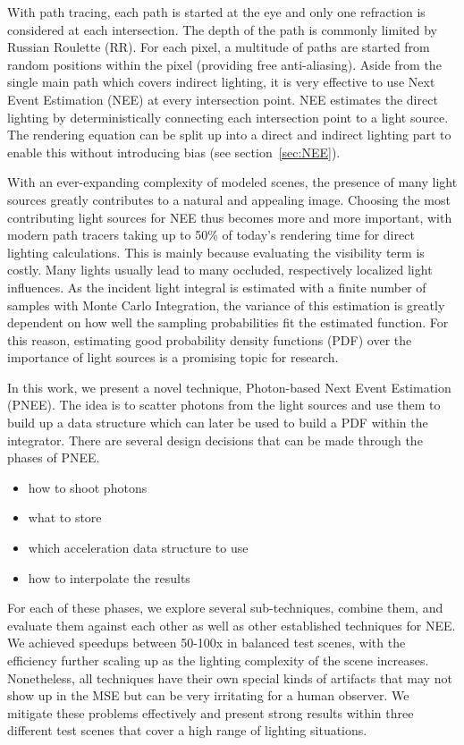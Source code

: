 With path tracing, each path is started at the eye and only one refraction is considered at each intersection. The depth of the path is commonly limited by Russian Roulette (RR). For each pixel, a multitude of paths are started from random positions within the pixel (providing free anti-aliasing). Aside from the single main path which covers indirect lighting, it is very effective to use Next Event Estimation (NEE) at every intersection point. NEE estimates the direct lighting by deterministically connecting each intersection point to a light source. The rendering equation can be split up into a direct and indirect lighting part to enable this without introducing bias (see section~\ref{sec:NEE}).

With an ever-expanding complexity of modeled scenes, the presence of many light sources greatly contributes to a natural and appealing image. Choosing the most contributing light sources for NEE thus becomes more and more important, with modern path tracers taking up to 50\% of today's rendering time for direct lighting calculations. This is mainly because evaluating the visibility term is costly. Many lights usually lead to many occluded, respectively localized light influences. As the incident light integral is estimated with a finite number of samples with Monte Carlo Integration, the variance of this estimation is greatly dependent on how well the sampling probabilities fit the estimated function. For this reason, estimating good probability density functions (PDF) over the importance of light sources is a promising topic for research.

In this work, we present a novel technique, Photon-based Next Event Estimation (PNEE). The idea is to scatter photons from the light sources and use them to build up a data structure which can later be used to build a PDF within the integrator. There are several design decisions that can be made through the phases of PNEE.

\begin{itemize}
    \item how to shoot photons
    \item what to store
    \item which acceleration data structure to use
    \item how to interpolate the results
\end{itemize}

For each of these phases, we explore several sub-techniques, combine them, and evaluate them against each other as well as other established techniques for NEE. We achieved speedups between 50-100x in balanced test scenes, with the efficiency further scaling up as the lighting complexity of the scene increases. Nonetheless, all techniques have their own special kinds of artifacts that may not show up in the MSE but can be very irritating for a human observer. We mitigate these problems effectively and present strong results within three different test scenes that cover a high range of lighting situations.

